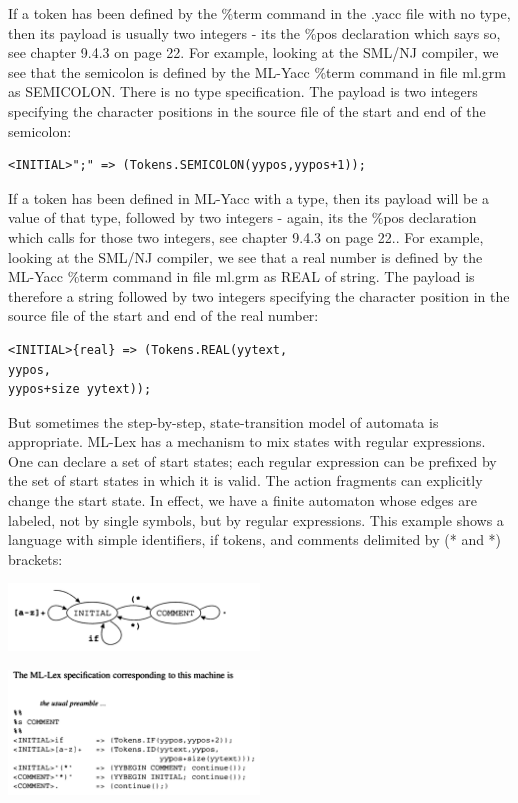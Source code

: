 \documentclass[8pt, a4paper, oneside, twocolumn]{extarticle}
\begin{document}
If a token has been defined by the \%term command in the .yacc file with no type,
then its payload is usually two integers - its the \%pos declaration which says so, see
chapter 9.4.3 on page 22. For example, looking at the SML/NJ compiler, we see that
the semicolon is defined by the ML-Yacc \%term command in file ml.grm as SEMICOLON.
There is no type specification. The payload is two integers specifying the character
positions in the source file of the start and end of the semicolon:
\begin{verbatim}
<INITIAL>";" => (Tokens.SEMICOLON(yypos,yypos+1));
\end{verbatim}
If a token has been defined in ML-Yacc with a type, then its payload will be a value
of that type, followed by two integers - again, its the \%pos declaration which calls for
those two integers, see chapter 9.4.3 on page 22.. For example, looking at the SML/NJ
compiler, we see that a real number is defined by the ML-Yacc \%term command in file
ml.grm as REAL of string. The payload is therefore a string followed by two integers
specifying the character position in the source file of the start and end of the real number:
\begin{verbatim}
<INITIAL>{real} => (Tokens.REAL(yytext,
yypos,
yypos+size yytext));
\end{verbatim}

But sometimes the step-by-step, state-transition model of automata is  
appropriate. ML-Lex has a mechanism to mix states with regular expressions. 
One can declare a set of start states; each regular expression can be prefixed 
by the set of start states in which it is valid. The action fragments can  
explicitly change the start state. In effect, we have a finite automaton whose edges 
are labeled, not by single symbols, but by regular expressions. This example 
shows a language with simple identifiers, if tokens, and comments delimited 
by (* and *) brackets: 

\includegraphics[width=0.5\textwidth,height=0.5\textheight,keepaspectratio]{lex3}

\includegraphics[width=0.5\textwidth,height=0.5\textheight,keepaspectratio]{lex4}
\end{document}
